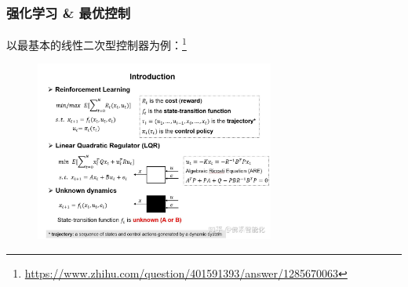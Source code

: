 \documentclass[12pt,AutoFakeBold,aspectratio=43,mathserif]{beamer}
\begin{document}
    \begin{frame}
        \frametitle{强化学习 \& 最优控制}
        以最基本的线性二次型控制器为例：\footnote{\url{https://www.zhihu.com/question/401591393/answer/1285670063}}
        \begin{figure}[htbp]
            \setlength{\abovecaptionskip}{0.cm}
            \setlength{\belowcaptionskip}{-0.cm}
            \centering
            \vspace{-0.3cm}
            \setlength{\abovecaptionskip}{0.cm}
            \setlength{\belowcaptionskip}{-0.cm}
            \includegraphics[width=0.7\textwidth]{figures/3-5.jpg}
        \end{figure}
        
    \end{frame}
\end{document}
